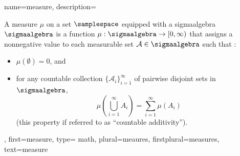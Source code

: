 {name={measure},
 description={A measure $\mu$ on a set $\samplespace$ equipped with a 
	\gls{sigmaalgebra} $\sigmaalgebra$ is a \gls{function} $\mu: \sigmaalgebra \to [0, \infty)$ 
	that assigns a nonnegative value to each \gls{measurable} set 
	$\mathcal{A} \in \sigmaalgebra$ such that \cite{BillingsleyProbMeasure,RudinBookPrinciplesMatheAnalysis,HalmosMeasure}: 
	\begin{itemize}
		\item $\mu(\emptyset) = 0$, and
		\item for any \gls{countable} collection $\{\mathcal{A}_i\}_{i=1}^{\infty}$ of 
		   pairwise disjoint sets in $\sigmaalgebra$,
		\[
			\mu\!\left(\bigcup_{i=1}^{\infty} A_i\right) = \sum_{i=1}^{\infty} \mu(A_i)
		\]
		(this property if referred to as ``\gls{countable} additivity'').
	\end{itemize}},
	first={measure},
	type= math, 
	plural={meaures}, 
	firstplural={measures}, 
	text={measure}
}



